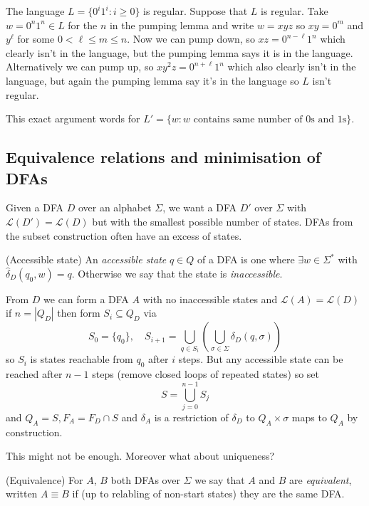 \documentclass[tikx, border = 10pt]{article}
\begin{document}
\begin{example}
	The language $ L = \{0^i1^i: i\ge 0\} $ is  regular. Suppose that $ L $ is regular. Take $ w = 0^n1^n\in L $ for the $ n $ in the pumping lemma and write $ w=xyz $ so $ xy=0^m $ and $ y^\ell $ for some $ 0<\ell \le m\le n $. Now we can pump down, so $ xz=0^{n-\ell}1^n $ which clearly isn't in the language, but the pumping lemma says it is in the language. Alternatively we can pump up, so $ xy^2z =  0^{n+\ell}1^n $ which also clearly isn't in the language, but again the pumping lemma say it's in the language so $ L $ isn't regular.\par
	This exact argument words for $ L' = \{w: w \text{ contains same number of } 0\text{s and } 1\text{s} \}$.
\end{example}
\subsection{Equivalence relations and minimisation of DFAs}
Given a DFA $ D $ over an alphabet $ \Sigma $, we want a DFA $ D' $ over $ \Sigma $ with $ \mathcal L(D') = \mathcal L(D) $ but with the smallest possible number of states. DFAs from the subset construction often have an excess of states. 
\begin{definition}
	(Accessible state) An \textit{accessible state} $ q\in Q $ of a DFA is one where $ \exists w\in \Sigma^* $ with $ \hat \delta_D(q_0,w) = q $. Otherwise we say that the state is \textit{inaccessible}.
\end{definition}
From $ D $ we can form a DFA $ A $ with no inaccessible states and $ \mathcal L(A) = \mathcal L(D) $ if $ n = |Q_D| $ then form $ S_i\subseteq Q_D $ via 
\[
	S_0 = \{q_0\},\quad S_{i+1} = \bigcup_{q\in S_i} \left(\bigcup_{\sigma\in \Sigma} \delta_D(q,\sigma)\right)
\]
so $ S_i $ is states reachable from $ q_0 $ after $ i $ steps. But any accessible state can be reached after $ n-1 $ steps (remove closed loops of repeated states) so set
\[
	S = \bigcup_{j=0}^{n-1} S_j
\]
and $ Q_A = S, F_A=F_D\cap S $ and $ \delta_A $ is a restriction of $ \delta_D $  to $ Q_A\times \sigma $ maps to $ Q_A $ by construction.
\begin{remark}
  This might not be enough. Moreover what about uniqueness?
\end{remark}
\begin{definition}
	(Equivalence) For $ A $, $ B $ both DFAs over $ \Sigma $ we say that $ A $ and $ B $ are \textit{equivalent}, written $ A\equiv B $ if (up to relabling of non-start states) they are the same DFA.
\end{definition}
\end{document}
